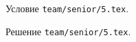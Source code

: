 \problem
Условие \texttt{team/senior/5.tex}.

\solution Решение \texttt{team/senior/5.tex}.
\endproblem
